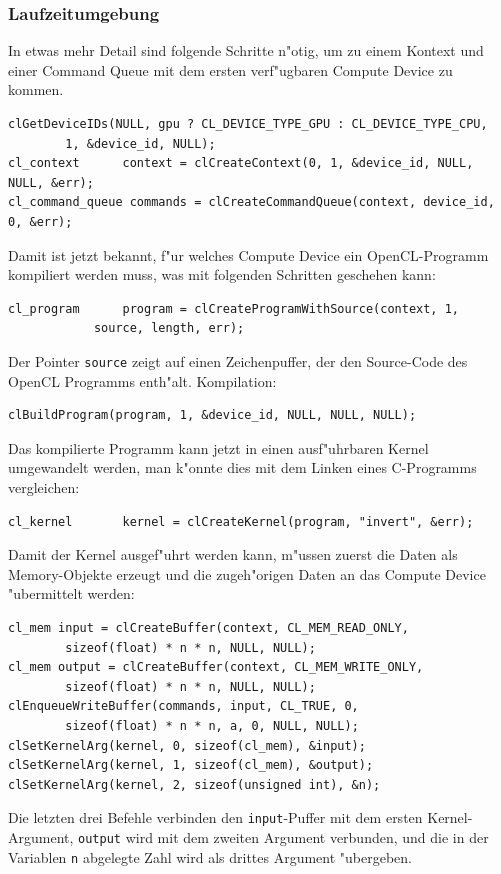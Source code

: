 \subsubsection{Laufzeitumgebung}
In etwas mehr Detail sind folgende Schritte n"otig, um zu einem
Kontext und einer Command Queue mit dem ersten verf"ugbaren
Compute Device zu kommen.
\begin{verbatim}
clGetDeviceIDs(NULL, gpu ? CL_DEVICE_TYPE_GPU : CL_DEVICE_TYPE_CPU,
        1, &device_id, NULL);
cl_context      context = clCreateContext(0, 1, &device_id, NULL, NULL, &err);
cl_command_queue commands = clCreateCommandQueue(context, device_id, 0, &err);
\end{verbatim}
Damit ist jetzt bekannt, f"ur welches Compute Device ein OpenCL-Programm
kompiliert werden muss, was mit folgenden Schritten geschehen kann:
\begin{verbatim}
cl_program      program = clCreateProgramWithSource(context, 1,
			source, length, err);
\end{verbatim}
Der Pointer \verb+source+ zeigt auf einen Zeichenpuffer, der den Source-Code
des OpenCL Programms enth"alt. Kompilation:
\begin{verbatim}
clBuildProgram(program, 1, &device_id, NULL, NULL, NULL);
\end{verbatim}
Das kompilierte Programm kann jetzt in einen ausf"uhrbaren
Kernel umgewandelt werden, man k"onnte dies mit dem Linken eines
C-Programms vergleichen:
\begin{verbatim}
cl_kernel       kernel = clCreateKernel(program, "invert", &err);
\end{verbatim}

Damit der Kernel ausgef"uhrt werden kann, m"ussen zuerst die Daten
als Memory-Objekte erzeugt und die zugeh"origen Daten an das Compute Device
"ubermittelt werden:
\begin{verbatim}
cl_mem input = clCreateBuffer(context, CL_MEM_READ_ONLY,
        sizeof(float) * n * n, NULL, NULL);
cl_mem output = clCreateBuffer(context, CL_MEM_WRITE_ONLY,
        sizeof(float) * n * n, NULL, NULL);
clEnqueueWriteBuffer(commands, input, CL_TRUE, 0,
        sizeof(float) * n * n, a, 0, NULL, NULL);
clSetKernelArg(kernel, 0, sizeof(cl_mem), &input);
clSetKernelArg(kernel, 1, sizeof(cl_mem), &output);
clSetKernelArg(kernel, 2, sizeof(unsigned int), &n);
\end{verbatim}
Die letzten drei Befehle verbinden den \verb+input+-Puffer mit dem ersten
Kernel-Argument, \verb+output+ wird mit dem zweiten
Argument verbunden, und die in der Variablen \verb+n+ abgelegte
Zahl wird als drittes Argument "ubergeben.

